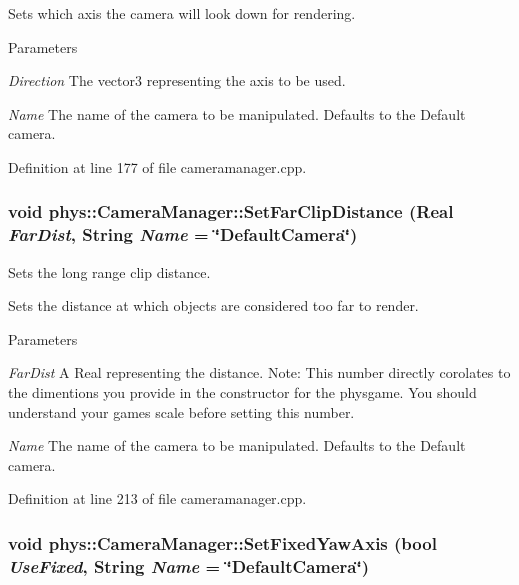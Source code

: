 Sets which axis the camera will look down for rendering. 
\begin{DoxyParams}{Parameters}
\item[{\em Direction}]The vector3 representing the axis to be used. \item[{\em Name}]The name of the camera to be manipulated. Defaults to the Default camera. \end{DoxyParams}


Definition at line 177 of file cameramanager.cpp.

\hypertarget{classphys_1_1CameraManager_a809e4e31a9ad42afd620e95508ad78d7}{
\subsubsection[{SetFarClipDistance}]{\setlength{\rightskip}{0pt plus 5cm}void phys::CameraManager::SetFarClipDistance ({\bf Real} {\em FarDist}, \/  {\bf String} {\em Name} = {\ttfamily \char`\"{}DefaultCamera\char`\"{}})}}
\label{d9/d91/classphys_1_1CameraManager_a809e4e31a9ad42afd620e95508ad78d7}


Sets the long range clip distance. 

Sets the distance at which objects are considered too far to render. 
\begin{DoxyParams}{Parameters}
\item[{\em FarDist}]A Real representing the distance. Note: This number directly corolates to the dimentions you provide in the constructor for the physgame. You should understand your games scale before setting this number. \item[{\em Name}]The name of the camera to be manipulated. Defaults to the Default camera. \end{DoxyParams}


Definition at line 213 of file cameramanager.cpp.

\hypertarget{classphys_1_1CameraManager_aa7370f2239e88ab151b72c4171afea07}{
\subsubsection[{SetFixedYawAxis}]{\setlength{\rightskip}{0pt plus 5cm}void phys::CameraManager::SetFixedYawAxis (bool {\em UseFixed}, \/  {\bf String} {\em Name} = {\ttfamily \char`\"{}DefaultCamera\char`\"{}})}}
\label{d9/d91/classphys_1_1CameraManager_aa7370f2239e88ab151b72c4171afea07}


